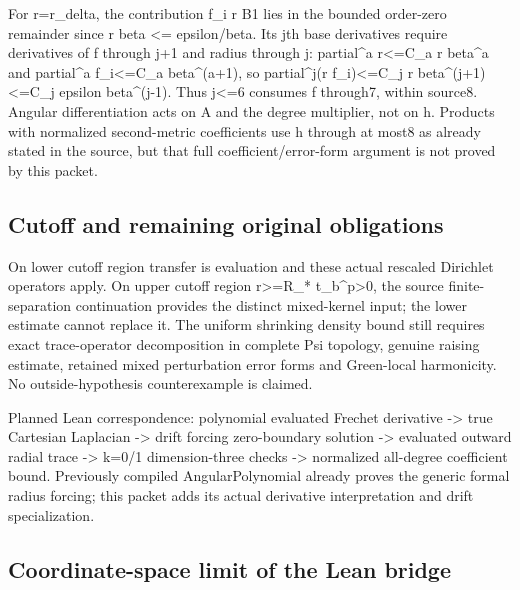 \documentclass[11pt]{article}
\theoremstyle{definition}
\theoremstyle{remark}
\numberwithin{equation}{section}
\begin{document}
For r=r\_delta, the contribution f\_i r B1 lies in the bounded
order-zero remainder since r beta \textless= epsilon/beta. Its jth base
derivatives require derivatives of f through j+1 and radius through j:
\textbar partial\^{}a r\textbar\textless=C\_a r beta\^{}a and
\textbar partial\^{}a f\_i\textbar\textless=C\_a beta\^{}(a+1), so
\textbar partial\^{}j(r f\_i)\textbar\textless=C\_j r
beta\^{}(j+1)\textless=C\_j epsilon beta\^{}(j-1). Thus j\textless=6
consumes f through7, within source8. Angular differentiation acts on A
and the degree multiplier, not on h. Products with normalized
second-metric coefficients use h through at most8 as already stated in
the source, but that full coefficient/error-form argument is not proved
by this packet.

\hypertarget{source-bf1ada3d0e91-cutoff-and-remaining-original-obligations}{%
\subsection{Cutoff and remaining original
obligations}\label{source-bf1ada3d0e91-cutoff-and-remaining-original-obligations}}

On lower cutoff region transfer is evaluation and these actual rescaled
Dirichlet operators apply. On upper cutoff region r\textgreater=R\_*
t\_b\^{}p\textgreater0, the source finite-separation continuation
provides the distinct mixed-kernel input; the lower estimate cannot
replace it. The uniform shrinking density bound still requires exact
trace-operator decomposition in complete Psi topology, genuine raising
estimate, retained mixed perturbation error forms and Green-local
harmonicity. No outside-hypothesis counterexample is claimed.

Planned Lean correspondence: polynomial evaluated Frechet derivative
-\textgreater{} true Cartesian Laplacian -\textgreater{} drift forcing
zero-boundary solution -\textgreater{} evaluated outward radial trace
-\textgreater{} k=0/1 dimension-three checks -\textgreater{} normalized
all-degree coefficient bound. Previously compiled AngularPolynomial
already proves the generic formal radius forcing; this packet adds its
actual derivative interpretation and drift specialization.

\hypertarget{source-bf1ada3d0e91-coordinate-space-limit-of-the-lean-bridge}{%
\subsection{Coordinate-space limit of the Lean
bridge}\label{source-bf1ada3d0e91-coordinate-space-limit-of-the-lean-bridge}}
\end{document}
